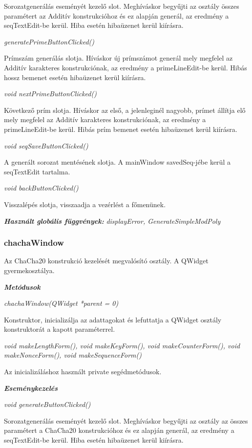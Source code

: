 \documentclass[12pt]{article}
\begin{document}
Sorozatgenerálás eseményét kezelő slot. Meghíváskor begyűjti az osztály összes paramétert az Additív konstrukcióhoz és ez alapján generál, az eredmény a seqTextEdit-be kerül. Hiba esetén hibaüzenet kerül kiírásra.

\textit{generatePrimeButtonClicked()}

Prímszám generálás slotja. Híváskor új prímszámot generál mely megfelel az Additív karakteres konstrukciónak, az eredmény a primeLineEdit-be kerül. Hibás hossz bemenet esetén hibaüzenet kerül kiírásra.

\textit{void nextPrimeButtonClicked()}

Következő prím slotja. Híváskor az első, a jelenleginél nagyobb, prímet állítja elő mely megfelel az Additív karakteres konstrukciónak, az eredmény a primeLineEdit-be kerül. Hibás prím bemenet esetén hibaüzenet kerül kiírásra.

\textit{void seqSaveButtonClicked()}

A generált sorozat mentésének slotja. A mainWindow savedSeq-jébe kerül a seqTextEdit tartalma.

\textit{void backButtonClicked()}

Visszalépés slotja, visszaadja a vezérlést a főmenünek.

\textit{\textbf{Használt globális függvények: }}\textit{displayError, GenerateSimpleModPoly}

\subsubsection*{chachaWindow}

Az ChaCha20 konstrukció kezelését megvalósító osztály. A QWidget gyermekosztálya.

\textit{\textbf{Metódusok}}

\textit{chachaWindow(QWidget *parent = 0)}

Konstruktor, inicializálja az adattagokat és lefuttatja a QWidget osztály konstruktorát a kapott paraméterrel.

\textit{void makeLengthForm(), void makeKeyForm(), void makeCounterForm(), void makeNonceForm(), void makeSequenceForm()}

Az inicializáláshoz használt private segédmetódusok.

\textit{\textbf{Eseménykezelés}}

\textit{void generateButtonClicked()}

Sorozatgenerálás eseményét kezelő slot. Meghíváskor begyűjti az osztály az összes paramétert a ChaCha20 konstrukcióhoz és ez alapján generál, az eredmény a seqTextEdit-be kerül. Hiba esetén hibaüzenet kerül kiírásra.
\end{document}

